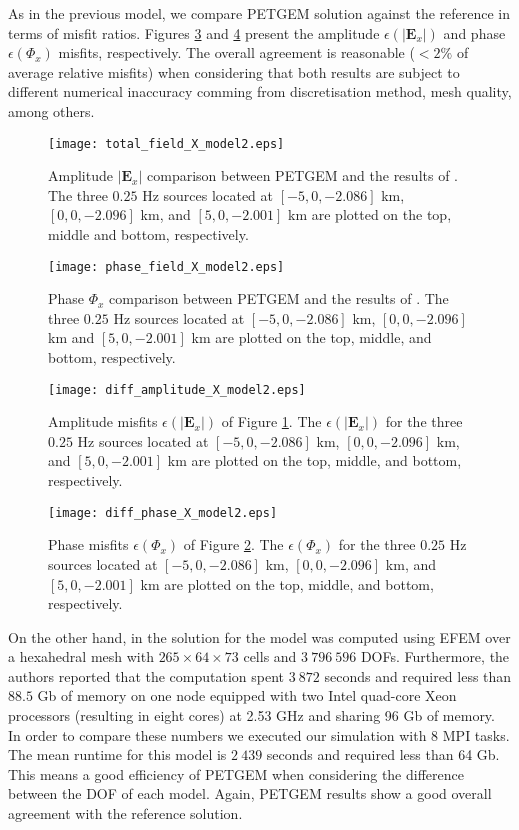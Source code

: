 \documentclass[review]{elsarticle}
\begin{document}
As in the previous model, we compare PETGEM solution against the reference in terms of misfit ratios. Figures \ref{fig:diff_amplitude_X_model2} and \ref{fig:diff_phase_X_model2} present the amplitude $\epsilon(|\mathbf{E}_{x}|)$ and phase $\epsilon(\Phi_{x})$ misfits, respectively. The overall agreement is reasonable ($<2\%$ of average relative misfits) when considering that both results are subject to different numerical inaccuracy comming from discretisation method, mesh quality, among others.
\begin{figure}[!htbp]
	\centering
	\texttt{[image: total\_field\_X\_model2.eps]}
	\caption{Amplitude $|\mathbf{E}_{x}|$ comparison between PETGEM and the results of \citet{Chung2014}. The three $0.25$ Hz sources located at $[-5, 0, -2.086]$ km, $[0, 0, -2.096]$ km, and $[5, 0, -2.001]$ km are plotted on the top, middle and bottom, respectively.}
	\label{fig:total_field_X_model2}
\end{figure}
\begin{figure}[!htbp]
	\centering
	\texttt{[image: phase\_field\_X\_model2.eps]}
	\caption{Phase $\Phi_{x}$ comparison between PETGEM and the results of \citet{Chung2014}. The three $0.25$ Hz sources located at $[-5, 0, -2.086]$ km, $[0, 0, -2.096]$ km and $[5, 0, -2.001]$ km are plotted on the top, middle, and bottom, respectively.}
	\label{fig:phase_field_X_model2}
\end{figure}
\begin{figure}[!htbp]
	\centering
	\texttt{[image: diff\_amplitude\_X\_model2.eps]}
	\caption{Amplitude misfits $\epsilon(|\mathbf{E}_{x}|)$ of Figure \ref{fig:total_field_X_model2}. The $\epsilon(|\mathbf{E}_{x}|)$ for the three $0.25$ Hz sources located at $[-5, 0, -2.086]$ km, $[0, 0, -2.096]$ km, and $[5, 0, -2.001]$ km are plotted on the top, middle, and bottom, respectively.}
	\label{fig:diff_amplitude_X_model2}
\end{figure}
\begin{figure}[!htbp]
	\centering
	\texttt{[image: diff\_phase\_X\_model2.eps]}
	\caption{Phase misfits $\epsilon(\Phi_{x})$ of Figure \ref{fig:phase_field_X_model2}. The $\epsilon(\Phi_{x})$ for the three $0.25$ Hz sources located at $[-5, 0, -2.086]$ km, $[0, 0, -2.096]$ km, and $[5, 0, -2.001]$ km are plotted on the top, middle, and bottom, respectively.}
	\label{fig:diff_phase_X_model2}
\end{figure}
On the other hand, in \citet{Chung2014} the solution for the model was computed using EFEM over a hexahedral mesh with $265\times64\times73$ cells and $3\:796\:596$ DOFs. Furthermore, the authors reported that the computation spent $3\:872$ seconds and required less than $88.5$ Gb of memory on one node equipped with two Intel quad-core Xeon processors (resulting in eight cores) at 2.53 GHz and sharing 96 Gb of memory. In order to compare these numbers we executed our simulation with 8 MPI tasks. The mean runtime for this model is $2\:439$ seconds and required less than 64 Gb. This means a good efficiency of PETGEM  when considering the difference between the DOF of each model. Again, PETGEM results show a good overall agreement with the reference solution.
\end{document}
